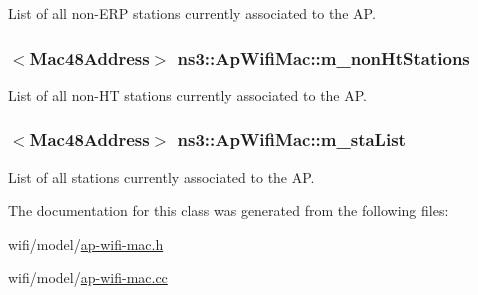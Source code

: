 List of all non-\/\+E\+RP stations currently associated to the AP. 

\subsubsection[{\texorpdfstring{m\+\_\+non\+Ht\+Stations}{m_nonHtStations}}]{$<${\bf Mac48\+Address}$>$ ns3\+::\+Ap\+Wifi\+Mac\+::m\+\_\+non\+Ht\+Stations\hspace{0.3cm}{\ttfamily [private]}}\hypertarget{classns3_1_1ApWifiMac_a148d1aa2c429b0530603c797775fa5da}{}\label{classns3_1_1ApWifiMac_a148d1aa2c429b0530603c797775fa5da}


List of all non-\/\+HT stations currently associated to the AP. 

\subsubsection[{\texorpdfstring{m\+\_\+sta\+List}{m_staList}}]{$<${\bf Mac48\+Address}$>$ ns3\+::\+Ap\+Wifi\+Mac\+::m\+\_\+sta\+List\hspace{0.3cm}{\ttfamily [private]}}\hypertarget{classns3_1_1ApWifiMac_a2a483f2002457f12a9e53e4b227cf1e8}{}\label{classns3_1_1ApWifiMac_a2a483f2002457f12a9e53e4b227cf1e8}


List of all stations currently associated to the AP. 



The documentation for this class was generated from the following files\+:\begin{DoxyCompactItemize}
\item 
wifi/model/\hyperlink{ap-wifi-mac_8h}{ap-\/wifi-\/mac.\+h}\item 
wifi/model/\hyperlink{ap-wifi-mac_8cc}{ap-\/wifi-\/mac.\+cc}\end{DoxyCompactItemize}
